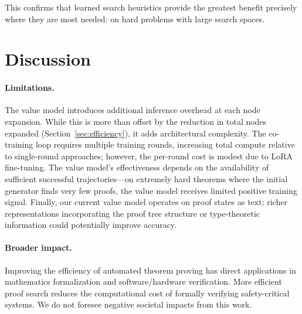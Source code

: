 \documentclass{article}
\begin{document}
This confirms that learned search heuristics provide the greatest benefit precisely where they are most needed: on hard problems with large search spaces.

\section{Discussion}
\label{sec:discussion}

\paragraph{Limitations.}
The value model introduces additional inference overhead at each node expansion. While this is more than offset by the reduction in total nodes expanded (Section~\ref{sec:efficiency}), it adds architectural complexity. The co-training loop requires multiple training rounds, increasing total compute relative to single-round approaches; however, the per-round cost is modest due to LoRA fine-tuning. The value model's effectiveness depends on the availability of sufficient successful trajectories---on extremely hard theorems where the initial generator finds very few proofs, the value model receives limited positive training signal. Finally, our current value model operates on proof states as text; richer representations incorporating the proof tree structure or type-theoretic information could potentially improve accuracy.

\paragraph{Broader impact.}
Improving the efficiency of automated theorem proving has direct applications in mathematics formalization and software/hardware verification. More efficient proof search reduces the computational cost of formally verifying safety-critical systems. We do not foresee negative societal impacts from this work.
\end{document}
